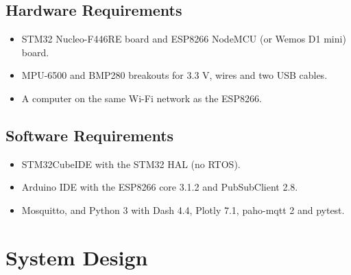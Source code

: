 \documentclass[12pt,a4paper]{report}
\begin{document}
\section{Hardware Requirements}
\begin{itemize}
\item STM32 Nucleo-F446RE board and ESP8266 NodeMCU (or Wemos D1 mini) board.
\item MPU-6500 and BMP280 breakouts for 3.3 V, wires and two USB cables.
\item A computer on the same Wi-Fi network as the ESP8266.
\end{itemize}

\section{Software Requirements}
\label{sec:sw}
\begin{itemize}
\item STM32CubeIDE with the STM32 HAL (no RTOS).
\item Arduino IDE with the ESP8266 core 3.1.2 and PubSubClient 2.8.
\item Mosquitto, and Python 3 with Dash 4.4, Plotly 7.1, paho-mqtt 2 and pytest.
\end{itemize}

\chapter{System Design}
\end{document}
